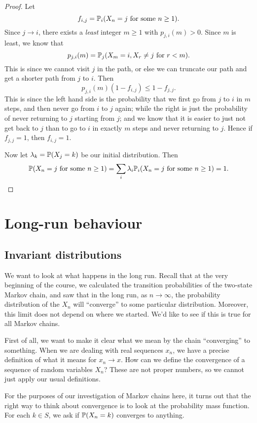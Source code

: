 \documentclass[a4paper]{article}
\begin{document}
\begin{proof}
  Let
  \[
    f_{i, j} = \P_i(X_n = j\text{ for some }n \geq 1).
  \]
  Since $j \to i$, there exists a \emph{least} integer $m \geq 1$ with $p_{j, i}(m) > 0$. Since $m$ is least, we know that
  \[
    p_{j, i}(m) = \P_j(X_m = i, X_r \not= j\text{ for }r < m).
  \]
  This is since we cannot visit $j$ in the path, or else we can truncate our path and get a shorter path from $j$ to $i$. Then
  \[
    p_{j, i}(m)(1 - f_{i, j}) \leq 1 - f_{j, j}.
  \]
  This is since the left hand side is the probability that we first go from $j$ to $i$ in $m$ steps, and then never go from $i$ to $j$ again; while the right is just the probability of never returning to $j$ starting from $j$; and we know that it is easier to just not get back to $j$ than to go to $i$ in exactly $m$ steps and never returning to $j$. Hence if $f_{j, j} = 1$, then $f_{i, j} = 1$.

  Now let $\lambda_k = \P(X_j = k)$ be our initial distribution. Then
  \[
    \P(X_n = j\text{ for some }n \geq 1) = \sum_i \lambda_i \P_i (X_n =j\text{ for some }n \geq 1) = 1.\qedhere
  \]
\end{proof}

\section{Long-run behaviour}
\subsection{Invariant distributions}
We want to look at what happens in the long run. Recall that at the very beginning of the course, we calculated the transition probabilities of the two-state Markov chain, and saw that in the long run, as $n \to \infty$, the probability distribution of the $X_n$ will ``converge'' to some particular distribution. Moreover, this limit does not depend on where we started. We'd like to see if this is true for all Markov chains.

First of all, we want to make it clear what we mean by the chain ``converging'' to something. When we are dealing with real sequences $x_n$, we have a precise definition of what it means for $x_n \to x$. How can we define the convergence of a sequence of random variables $X_n$? These are not proper numbers, so we cannot just apply our usual definitions.

For the purposes of our investigation of Markov chains here, it turns out that the right way to think about convergence is to look at the probability mass function. For each $k \in S$, we ask if $\P(X_n = k)$ converges to anything.
\end{document}
